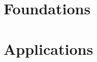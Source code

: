 \documentclass{book}
\begin{document}
\frontmatter

\mainmatter
\part{Foundations}


\part{Applications}

\backmatter
\end{document}
